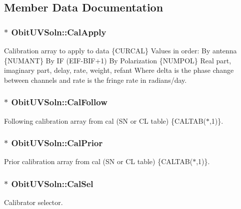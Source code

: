 \subsection{Member Data Documentation}
\subsubsection{$\ast$ {\bf Obit\-UVSoln::Cal\-Apply}}\label{structObitUVSoln_o29}


Calibration array to apply to data \{CURCAL\} Values in order: By antenna \{NUMANT\} By IF (EIF-BIF+1) By Polarization \{NUMPOL\} Real part, imaginary part, delay, rate, weight, refant Where delta is the phase change between channels and rate is the fringe rate in radians/day. 

\subsubsection{$\ast$ {\bf Obit\-UVSoln::Cal\-Follow}}\label{structObitUVSoln_o31}


Following calibration array from cal (SN or CL table) \{CALTAB($\ast$,1)\}. 

\subsubsection{$\ast$ {\bf Obit\-UVSoln::Cal\-Prior}}\label{structObitUVSoln_o30}


Prior calibration array from cal (SN or CL table) \{CALTAB($\ast$,1)\}. 

\subsubsection{$\ast$ {\bf Obit\-UVSoln::Cal\-Sel}}\label{structObitUVSoln_o9}


Calibrator selector. 

